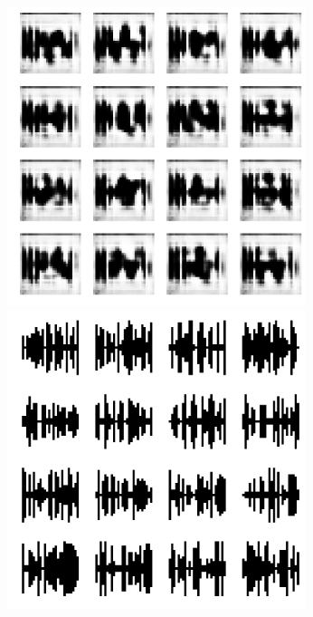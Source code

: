 \documentclass{article}
\begin{document}
\clearpage
\begin{figure}[ht]
\label{fig:gan-samples-reflection}
\centering
\includegraphics[height=330px]{gan-sample-fake-reflection.png}
\caption{}
\includegraphics[height=330px]{gan-sample-real-reflection.png}
\end{figure}
\end{document}
